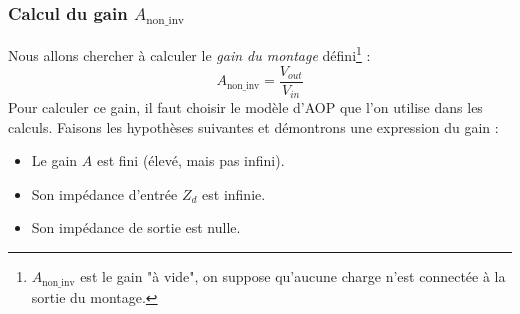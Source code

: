 \documentclass	[11pt, a4paper, openany]{book}
\begin{document}
\subsubsection{Calcul du gain $A_{\text{non\_inv}}$}
Nous allons chercher à calculer le \textit{gain du montage} défini\footnote{$A_{\text{non\_inv}}$ est le gain "à vide", on suppose qu'aucune charge n'est connectée à la sortie du montage.} :
\begin{equation}
A_{\text{non\_inv}} = \frac{V_{out}}{V_{in}}
\end{equation}
Pour calculer ce gain, il faut choisir le modèle d'AOP que l'on utilise dans les calculs. Faisons les hypothèses suivantes et démontrons une expression du gain :
\begin{itemize}
\item Le gain $A$ est fini (élevé, mais pas infini).
\item Son impédance d'entrée $Z_d$ est infinie.
\item Son impédance de sortie est nulle.
\end{itemize}
\end{document}
